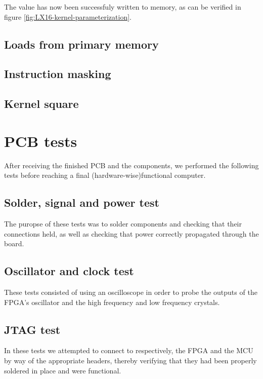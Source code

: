 \documentclass[../main/report.tex]{subfiles}
\begin{document}
The value has now been successfuly written to memory, as can be verified in figure \ref{fig:LX16-kernel-parameterization}.

\subsection{Loads from primary memory}

\subsection{Instruction masking}

\subsection{Kernel square}







\section{PCB tests}

After receiving the finished PCB and the components, we performed the following tests before reaching a final (hardware-wise)functional computer.   

\subsection{Solder, signal and power test}
The puropse of these tests was to solder components and checking that their connections held, as well as checking that power correctly propagated through the board.  


\subsection{Oscillator and clock test}
These tests consisted of using an oscilloscope in order to probe the outputs of the FPGA's oscillator and the high frequency and low frequency crystals.


\subsection{JTAG test}
In these tests we attempted to connect to respectively, the FPGA and the MCU by way of the appropriate headers, thereby verifying that they had been properly soldered in place and were functional.

\end{document}
